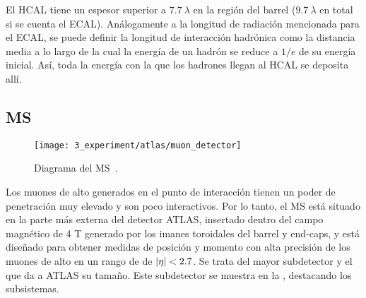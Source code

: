 El \ac{HCAL} tiene un espesor superior a \(7.7~\lambda\) en la región del barrel (\(9.7~\lambda\) en total si se cuenta el \ac{ECAL}). Análogamente a la longitud de radiación mencionada para el \ac{ECAL}, se puede definir la longitud de interacción hadrónica como la distancia media a lo largo de la cual la energía de un hadrón se reduce a \(1/e\) de su energía inicial. Así, toda la energía con la que los hadrones llegan al \ac{HCAL} se deposita allí.





\subsection{\acf{MS}}
\label{subsubsec:atlas:atlas:ms}

\begin{figure}[ht!]
    \centering
    \texttt{[image: 3\_experiment/atlas/muon\_detector]}
    \caption{Diagrama del \acf{MS}~\cite{ATLAS}.}
    \label{fig:atlas:atlas:muon_spectrometer:muon_spectrometer}
\end{figure}

Los muones de alto \pt generados en el punto de interacción tienen un poder de penetración muy elevado y son poco interactivos. Por lo tanto, el \ac{MS} \cite{ATLAS-Muon-TDR} está situado en la parte más externa del detector \ac{ATLAS}, insertado dentro del campo magnético de 4 T generado por los imanes toroidales del barrel y end-caps, y está diseñado para obtener medidas de posición y momento con alta precisión de los muones de alto \pt en un rango de \abseta de \(|\eta|<2.7\). Se trata del mayor subdetector y el que da a \ac{ATLAS} su tamaño. Este subdetector se muestra en la \Fig{\ref{fig:atlas:atlas:muon_spectrometer:muon_spectrometer}}, destacando los subsistemas.

